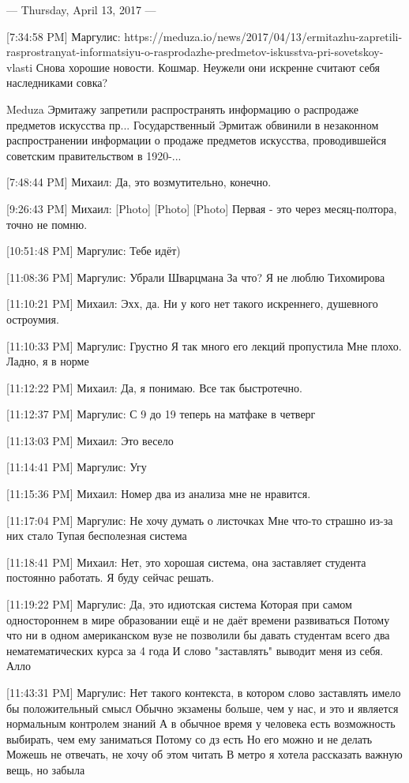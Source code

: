 \documentclass{article}
\begin{document}
--- Thursday, April 13, 2017 ---

[7:34:58 PM] Маргулис:
https://meduza.io/news/2017/04/13/ermitazhu-zapretili-rasprostranyat-informatsiyu-o-rasprodazhe-predmetov-iskusstva-pri-sovetskoy-vlasti
Снова хорошие новости. 
Кошмар. 
Неужели они искренне считают себя наследниками совка?

Meduza
Эрмитажу запретили распространять информацию о распродаже предметов искусства пр...
Государственный Эрмитаж обвинили в незаконном распространении информации о продаже предметов искусства, проводившейся советским правительством в 1920-...

[7:48:44 PM] Михаил:
Да, это возмутительно, конечно.

[9:26:43 PM] Михаил:
[Photo]
 [Photo]
 [Photo]
 Первая - это через месяц-полтора, точно не помню.

[10:51:48 PM] Маргулис:
Тебе идёт)

[11:08:36 PM] Маргулис:
Убрали Шварцмана
 За что?
 Я не люблю Тихомирова

[11:10:21 PM] Михаил:
Эхх, да. Ни у кого нет такого искреннего, душевного остроумия.

[11:10:33 PM] Маргулис:
Грустно
 Я так много его лекций пропустила
 Мне плохо.
 Ладно, я в норме

[11:12:22 PM] Михаил:
Да, я понимаю. Все так быстротечно.

[11:12:37 PM] Маргулис:
С 9 до 19 теперь на матфаке в четверг

[11:13:03 PM] Михаил:
Это весело

[11:14:41 PM] Маргулис:
Угу

[11:15:36 PM] Михаил:
Номер два из анализа мне не нравится.

[11:17:04 PM] Маргулис:
Не хочу думать о листочках
 Мне что-то страшно из-за них стало
 Тупая бесполезная система

[11:18:41 PM] Михаил:
Нет, это хорошая система, она заставляет студента постоянно работать.
 Я буду сейчас решать.

[11:19:22 PM] Маргулис:
Да, это идиотская система
 Которая при самом одностороннем в мире образовании ещё и не даёт времени развиваться
 Потому что ни в одном американском вузе не позволили бы давать студентам всего два нематематических курса за 4 года
 И слово "заставлять" выводит меня из себя.
 Алло

[11:43:31 PM] Маргулис:
Нет такого контекста, в котором слово заставлять имело бы положительный смысл
 Обычно экзамены больше, чем у нас, и это и является нормальным контролем знаний
 А в обычное время у человека есть возможность выбирать, чем ему заниматься
 Потому со дз есть
 Но его можно и не делать
 Можешь не отвечать, не хочу об этом читать
 В метро я хотела рассказать важную вещь, но забыла
\end{document}
